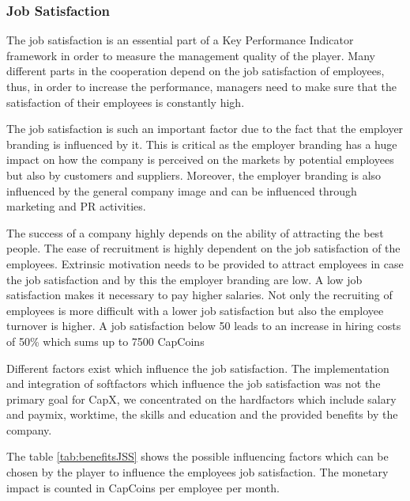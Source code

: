 \subsubsection{Job Satisfaction}
\label{subsub:jss}
The job satisfaction is an essential part of a Key Performance Indicator framework in order to measure the management quality of the player. Many different parts in the cooperation depend on the job satisfaction of employees, thus, in order to increase the performance, managers need to make sure that the satisfaction of their employees is constantly high. \cite{KOYS}

The job satisfaction is such an important factor due to the fact that the employer branding is influenced by it. This is critical as the employer branding has a huge impact on how the company is perceived on the markets by potential employees but also by customers and suppliers. Moreover, the employer branding is also influenced by the general company image and can be influenced through marketing and PR activities. 

The success of a company highly depends on the ability of attracting the best people. The ease of recruitment is highly dependent on the job satisfaction of the employees. Extrinsic motivation needs to be provided to attract employees in case the job satisfaction and by this the employer branding are low. A low job satisfaction makes it necessary to pay higher salaries. Not only the recruiting of employees is more difficult with a lower job satisfaction but also the employee turnover is higher. A job satisfaction below 50 leads to an increase in hiring costs of 50\% which sums up to 7500 CapCoins \cite{frederiksen2016}

Different factors exist which influence the job satisfaction. \cite{Kapur} The implementation and integration of softfactors which influence the job satisfaction was not the primary goal for CapX, we concentrated on the hardfactors which include salary and paymix, worktime, the skills and education and the provided benefits by the company. 

The table \ref{tab:benefitsJSS} shows the possible influencing factors which can be chosen by the player to influence the employees job satisfaction. The monetary impact is counted in CapCoins per employee per month. 

